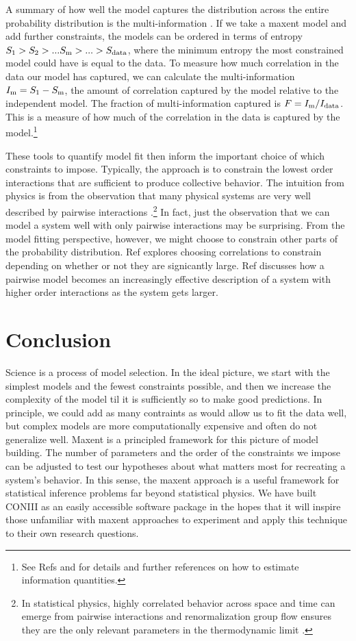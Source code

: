 \documentclass[aps,prl,twocolumn,nofootinbib]{revtex4-1}
\begin{document}
A summary of how well the model captures the distribution across the entire probability distribution is the multi-information \cite{Nemenman:2004wz,Schneidman:2006he}. If we take a maxent model and add further constraints, the models can be ordered in terms of entropy $S_{\rm 1}>S_{2}>...S_{\rm m}>...>S_{\rm data}$, where the minimum entropy the most constrained model could have is equal to the data. To measure how much correlation in the data our model has captured, we can calculate the multi-information $I_{\rm m} = S_{\rm 1}-S_{\rm m}$, the amount of correlation captured by the model relative to the independent model. The fraction of multi-information captured is $F=I_{\rm m}/I_{\rm data}$. This is a measure of how much of the correlation in the data is captured by the model.\footnote{See Refs \cite{Bialek:2012ueb} and \cite{Lee:2015ev} for details and further references on how to estimate information quantities.}

These tools to quantify model fit then inform the important choice of which constraints to impose. Typically, the approach is to constrain the lowest order interactions that are sufficient to produce collective behavior. The intuition from physics is from the observation that many physical systems are very well described by pairwise interactions \cite{Ranganathan:2007wz}.\footnote{In statistical physics, highly correlated behavior across space and time can emerge from pairwise interactions and renormalization group flow ensures they are the only relevant parameters in the thermodynamic limit \cite{}.} In fact, just the observation that we can model a system well with only pairwise interactions may be surprising. From the model fitting perspective, however, we might choose to constrain other parts of the probability distribution. Ref \cite{Ganmor:2011ct} explores choosing correlations to constrain depending on whether or not they are signicantly large. Ref \cite{Nemenman:2016kl} discusses how a pairwise model becomes an increasingly effective description of a system with higher order interactions as the system gets larger.



\section{Conclusion}
Science is a process of model selection. In the ideal picture, we start with the simplest models and the fewest constraints possible, and then we increase the complexity of the model til it is sufficiently so to make good predictions. In principle, we could add as many contraints as would allow us to fit the data well, but complex models are more computationally expensive and often do not generalize well.
Maxent is a principled framework for this picture of model building. The number of parameters and the order of the constraints we impose can be adjusted to test our hypotheses about what matters most for recreating a system's behavior.
In this sense, the maxent approach is a useful framework for statistical inference problems far beyond statistical physics.  We have built CONIII as an easily accessible software package in the hopes that it will inspire those unfamiliar with maxent approaches to experiment and apply this technique to their own research questions.
\end{document}
